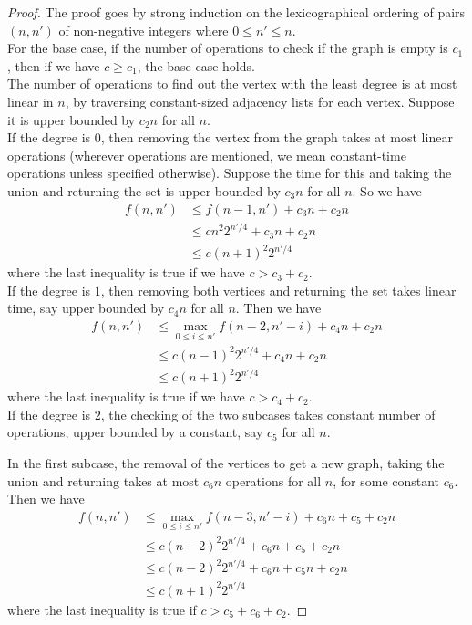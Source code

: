 \documentclass[answers]{exam}
\newcommand{\nl}{\vspace{0.2cm}\\}
\begin{document}
\begin{questions}
\begin{solution}
\begin{proof}
    The proof goes by strong induction on the lexicographical ordering of pairs $(n, n')$ of non-negative integers where $0 \le n' \le n$.\nl
    For the base case, if the number of operations to check if the graph is empty is $c_1$, then if we have $c \ge c_1$, the base case holds.\nl
    The number of operations to find out the vertex with the least degree is at most linear in $n$, by traversing constant-sized adjacency lists for each vertex. Suppose it is upper bounded by
    $c_2n$ for all $n$.\nl
    If the degree is $0$, then removing the vertex from the graph takes at most linear operations (wherever operations are mentioned, we mean constant-time operations unless specified otherwise).
    Suppose the time for this and taking the union and returning the set is upper bounded by $c_3n$ for all $n$. So we have 
    \begin{align*}
        f(n, n') &\le f(n - 1, n') + c_3 n + c_2 n\\
        &\le cn^2 2^{n'/4} + c_3 n + c_2 n\\
        &\le c(n + 1)^2 2^{n' / 4}
    \end{align*}
        where the last inequality is true if we have $c > c_3 + c_2$.\nl
    If the degree is $1$, then removing both vertices and returning the set takes linear time, say upper bounded by $c_4n$ for all $n$. Then we have \begin{align*}
        f(n, n') &\le \max_{0 \le i \le n'}f(n - 2, n' - i) + c_4 n + c_2 n\\
        &\le c(n - 1)^2 2^{n'/4} + c_4n + c_2 n\\
        &\le c(n + 1)^2 2^{n'/4}
\end{align*}
    where the last inequality is true if we have $c > c_4 + c_2$.\nl
    If the degree is $2$, the checking of the two subcases takes constant number of operations, upper bounded by a constant, say $c_5$ for all $n$.
    
    In the first subcase, the removal of the vertices to get a new graph, taking the union and returning takes at most $c_6 n$ operations for all $n$, for some constant $c_6$. Then we have 
    \begin{align*}
        f(n, n') &\le \max_{0 \le i \le n'}f(n - 3, n' - i) + c_6 n + c_5 + c_2 n\\
                &\le c(n - 2)^2 2^{n'/4} + c_6n + c_5 + c_2 n\\
                &\le c(n - 2)^2 2^{n'/4} + c_6n + c_5n + c_2 n\\
                &\le c(n + 1)^2 2^{n'/4} 
    \end{align*}
    where the last inequality is true if $c > c_5 + c_6 + c_2$.
    

\end{proof}
\end{solution}
\end{questions}
\end{document}
